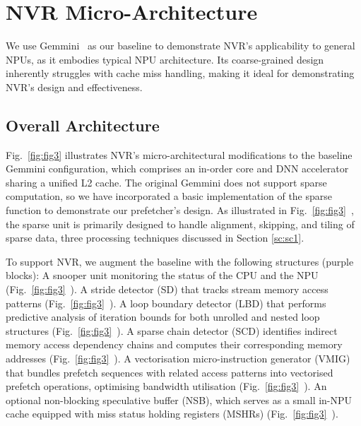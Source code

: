 \section{NVR Micro-Architecture}



We use Gemmini~\cite{gemmini} as our baseline to demonstrate NVR's applicability to general NPUs, as it embodies typical NPU architecture. %
Its coarse-grained design inherently struggles with cache miss handling, making it ideal for demonstrating NVR's design and effectiveness.

\subsection{Overall Architecture}
\vspace{-1.5pt}



Fig.~\ref{fig:fig3} illustrates NVR's micro-architectural modifications to the baseline Gemmini configuration, which comprises an in-order core and DNN accelerator sharing a unified L2 cache.
The original Gemmini does not support sparse computation, so we have incorporated a basic implementation of the sparse function to demonstrate our prefetcher's design.
As illustrated in Fig.~\ref{fig:fig3}~, the sparse unit is primarily designed to handle alignment, skipping, and tiling of sparse data, three processing techniques discussed in Section \ref{sc:sc1}.


To support NVR, we augment the baseline with the following structures (purple blocks):
A snooper unit monitoring the status of the CPU and the NPU (Fig.~\ref{fig:fig3}~).
A stride detector (SD) that tracks stream memory access patterns (Fig.~\ref{fig:fig3}~).
A loop boundary detector (LBD) that performs predictive analysis of iteration bounds for both unrolled and nested loop structures (Fig.~\ref{fig:fig3}~).
A sparse chain detector (SCD) identifies indirect memory access dependency chains and computes their corresponding memory addresses (Fig.~\ref{fig:fig3}~).
A vectorisation micro-instruction generator (VMIG) that bundles prefetch sequences with related access patterns into vectorised prefetch operations, optimising bandwidth utilisation (Fig.~\ref{fig:fig3}~).
An optional non-blocking speculative buffer (NSB), which serves as a small in-NPU cache equipped with miss status holding registers (MSHRs) (Fig.~\ref{fig:fig3}~).

